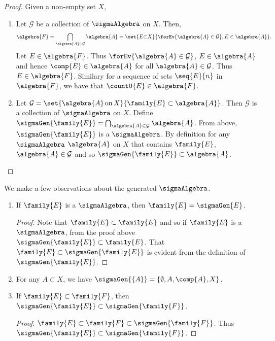 \begin{proof}
    Given a non-empty set $X$,
    \begin{enumerate}
	\item
	    Let $\mathcal{G}$ be a collection of $\sigmaAlgebra$ on $X$. Then,
	    \begin{equation*}
		\algebra{F} = \bigcap_{\algebra{A} \in \mathcal{G}}\algebra{A} =
		\set{E{\subset}X}{\forEv{\algebra{A}\in\mathcal{G}},E\in\algebra{A}}.
	    \end{equation*}
	    Let $E \in \algebra{F}$. Thus $\forEv{\algebra{A} \in \mathcal{G}}$, $E \in \algebra{A}$ and
	    hence $\comp{E} \in \algebra{A}$ for all $\algebra{A} \in \mathcal{G}$. Thus $E \in
	    \algebra{F}$. Similary for a sequence of sets $\seq{E}{n}$ in $\algebra{F}$, 
	    we have that $\countU{E} \in \algebra{F}$.
	\item
	    Let $\mathcal{G} = \set{\algebra{A}\,\text{on}\,X}{\family{E}\subset\algebra{A}}$. Then
	    $\mathcal{G}$ is a collection of $\sigmaAlgebra$ on $X$.
	    Define $\sigmaGen{\family{E}} = \bigcap_{\algebra{A} \in \mathcal{G}}\algebra{A}$. From above,
	    $\sigmaGen{\family{E}}$ is a $\sigmaAlgebra$. By definition for any $\sigmaAlgebra$ $\algebra{A}$
	    on $X$ that contains $\family{E}$, $\algebra{A} \in \mathcal{G}$ and so
	    $\sigmaGen{\family{E}}
	    \subset\algebra{A}$.
    \end{enumerate}
\end{proof}
\begin{Remark}\label{rmk:obs_sigma_gen}
    We make a few observations about the generated $\sigmaAlgebra$.
    \begin{enumerate}
	\item
	    If $\family{E}$ is a $\sigmaAlgebra$, then $\family{E} = \sigmaGen{E}$.
	    \begin{proof}
		Note that $\family{E} \subset \family{E}$ and so if $\family{E}$ is a
		$\sigmaAlgebra$, from the proof above $\sigmaGen{\family{E}} \subset \family{E}$.
		That $\family{E} \subset \sigmaGen{\family{E}}$ is evident from the definition of
		$\sigmaGen{\family{E}}$.
	    \end{proof}
	\item
	    For any $A \subset X$, we have $\sigmaGen{\lbrace A \rbrace} = \lbrace \emptyset, A,
	    \comp{A},X\rbrace$.
	\item If $\family{E} \subset \family{F}$, then $\sigmaGen{\family{E}} \subset
	    \sigmaGen{\family{F}}$.
	    \begin{proof}
		$\family{E} \subset \family{F} \subset \sigmaGen{\family{F}}$. Thus
		$\sigmaGen{\family{E}} \subset \sigmaGen{\family{F}}$.
	    \end{proof}
    \end{enumerate}
\end{Remark}
